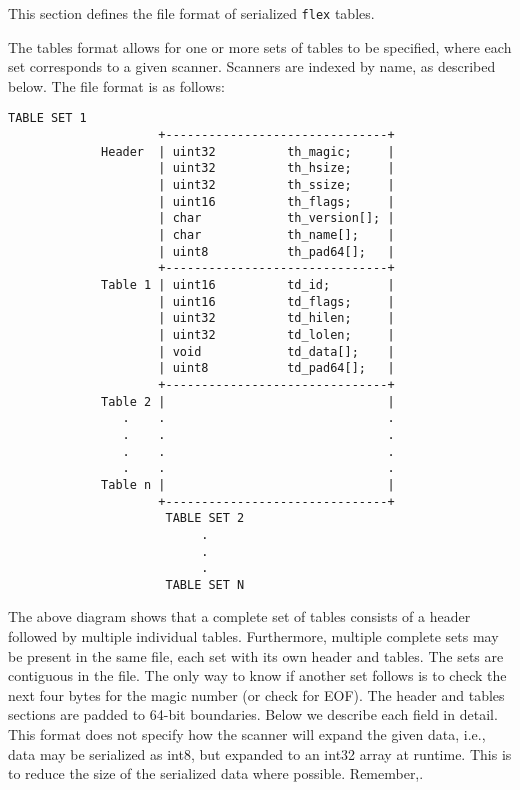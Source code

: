 \documentclass[openany,oneside]{book}
\begin{document}
This section defines the file format of serialized \verb`flex` tables.

The tables format allows for one or more sets of tables to be
specified, where each set corresponds to a given scanner. Scanners are
indexed by name, as described below. The file format is as follows:
\begin{verbatim}
TABLE SET 1
                     +-------------------------------+
             Header  | uint32          th_magic;     |
                     | uint32          th_hsize;     |
                     | uint32          th_ssize;     |
                     | uint16          th_flags;     |
                     | char            th_version[]; |
                     | char            th_name[];    |
                     | uint8           th_pad64[];   |
                     +-------------------------------+
             Table 1 | uint16          td_id;        |
                     | uint16          td_flags;     |
                     | uint32          td_hilen;     |
                     | uint32          td_lolen;     |
                     | void            td_data[];    |
                     | uint8           td_pad64[];   |
                     +-------------------------------+
             Table 2 |                               |
                .    .                               .
                .    .                               .
                .    .                               .
                .    .                               .
             Table n |                               |
                     +-------------------------------+
                      TABLE SET 2
                           .
                           .
                           .
                      TABLE SET N
\end{verbatim}


The above diagram shows that a complete set of tables consists of a header
followed by multiple individual tables. Furthermore, multiple complete sets may
be present in the same file, each set with its own header and tables. The sets
are contiguous in the file. The only way to know if another set follows is to
check the next four bytes for the magic number (or check for EOF). The header
and tables sections are padded to 64-bit boundaries. Below we describe each
field in detail. This format does not specify how the scanner will expand the
given data, i.e., data may be serialized as int8, but expanded to an int32
array at runtime. This is to reduce the size of the serialized data where
possible.  Remember,.
\end{document}
